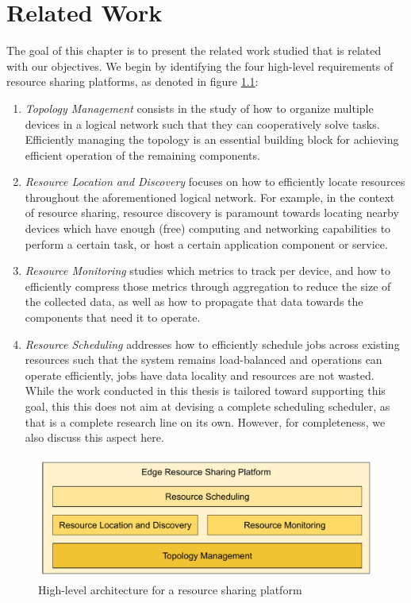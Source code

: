 \chapter{Related Work} 
\label{cha:related_work}

The goal of this chapter is to present the related work studied that is related with our objectives. We begin by identifying the four high-level requirements of resource sharing platforms, as denoted in figure \ref{fig:proposed_architecture}:

\begin{enumerate}

    \item \textit{Topology Management} consists in the study of how to organize multiple devices in a logical network such that they can cooperatively solve tasks. Efficiently managing the topology is an essential building block for achieving efficient operation of the remaining components. 
    
    \item \textit{Resource Location and Discovery} focuses on how to efficiently locate resources throughout the aforementioned logical network. For example, in the context of resource sharing, resource discovery is paramount towards locating nearby devices which have enough (free) computing and networking capabilities to perform a certain task, or host a certain application component or service.
    
    \item \textit{Resource Monitoring} studies which metrics to track per device, and how to efficiently compress those metrics through aggregation to reduce the size of the collected data, as well as how to propagate that data towards the components that need it to operate.

    \item \textit{Resource Scheduling} addresses how to efficiently schedule jobs across existing resources such that the system remains load-balanced and operations can operate efficiently, jobs have data locality and resources are not wasted. While the work conducted in this thesis is tailored toward supporting this goal, this this does not aim at devising a complete scheduling scheduler, as that is a complete research line on its own. However, for completeness, we also discuss this aspect here.

\end{enumerate}

\begin{figure}[h]
    \centering
    \includegraphics[width=\linewidth]{Figures/proposed_architecture.pdf}
    \caption{High-level architecture for a resource sharing platform}
    \label{fig:proposed_architecture}
\end{figure}

